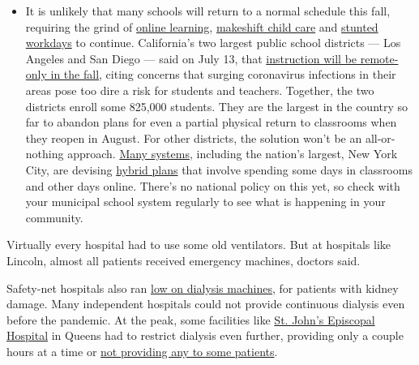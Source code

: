 \begin{itemize}
  \begin{itemize}
  \tightlist
  \item
    It is unlikely that many schools will return to a normal schedule
    this fall, requiring the grind of
    \href{https://www.nytimes.com/2020/06/05/us/coronavirus-education-lost-learning.html?action=click\&pgtype=Article\&state=default\&region=MAIN_CONTENT_3\&context=storylines_faq}{online
    learning},
    \href{https://www.nytimes.com/2020/05/29/us/coronavirus-child-care-centers.html?action=click\&pgtype=Article\&state=default\&region=MAIN_CONTENT_3\&context=storylines_faq}{makeshift
    child care} and
    \href{https://www.nytimes.com/2020/06/03/business/economy/coronavirus-working-women.html?action=click\&pgtype=Article\&state=default\&region=MAIN_CONTENT_3\&context=storylines_faq}{stunted
    workdays} to continue. California's two largest public school
    districts --- Los Angeles and San Diego --- said on July 13, that
    \href{https://www.nytimes.com/2020/07/13/us/lausd-san-diego-school-reopening.html?action=click\&pgtype=Article\&state=default\&region=MAIN_CONTENT_3\&context=storylines_faq}{instruction
    will be remote-only in the fall}, citing concerns that surging
    coronavirus infections in their areas pose too dire a risk for
    students and teachers. Together, the two districts enroll some
    825,000 students. They are the largest in the country so far to
    abandon plans for even a partial physical return to classrooms when
    they reopen in August. For other districts, the solution won't be an
    all-or-nothing approach.
    \href{https://bioethics.jhu.edu/research-and-outreach/projects/eschool-initiative/school-policy-tracker/}{Many
    systems}, including the nation's largest, New York City, are
    devising
    \href{https://www.nytimes.com/2020/06/26/us/coronavirus-schools-reopen-fall.html?action=click\&pgtype=Article\&state=default\&region=MAIN_CONTENT_3\&context=storylines_faq}{hybrid
    plans} that involve spending some days in classrooms and other days
    online. There's no national policy on this yet, so check with your
    municipal school system regularly to see what is happening in your
    community.
  \end{itemize}
\end{itemize}

Virtually every hospital had to use some old ventilators. But at
hospitals like Lincoln, almost all patients received emergency machines,
doctors said.

Safety-net hospitals also ran
\href{https://www.nytimes.com/2020/04/18/health/kidney-dialysis-coronavirus.html}{low
on dialysis machines}, for patients with kidney damage. Many independent
hospitals could not provide continuous dialysis even before the
pandemic. At the peak, some facilities like
\href{https://www.nytimes.com/video/us/100000007097093/coronavirus-st-johns-hospital-far-rockaway.html}{St.
John's Episcopal Hospital} in Queens had to restrict dialysis even
further, providing only a couple hours at a time or
\href{https://www.nytimes.com/2020/05/01/health/coronavirus-dialysis-death.html}{not
providing any to some patients}.

